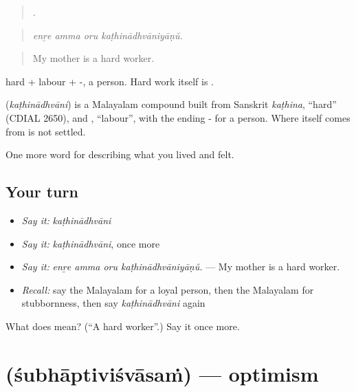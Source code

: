 \begin{quote}
   .
\end{quote}

\begin{quote}
\emph{enṟe amma oru kaṭhinādhvāniyāṇŭ.}
\end{quote}

\begin{quote}
My mother is a hard worker.
\end{quote}

 hard +  labour + -, a person. Hard work itself is .

\begin{cousinweb}
\textbf{} (\emph{kaṭhinādhvāni}) is a Malayalam compound built from Sanskrit \emph{kaṭhina}, \textquotedblleft{}hard\textquotedblright{} (CDIAL 2650), and , \textquotedblleft{}labour\textquotedblright{}, with the ending - for a person. Where  itself comes from is not settled.
\end{cousinweb}

\begin{grammarlens}[title={What you've built}]
One more word for describing what you lived and felt.
\end{grammarlens}

\subsection*{Your turn}
\begin{itemize}
\raggedright
  \item \emph{Say it:} \emph{kaṭhinādhvāni}
  \item \emph{Say it:} \emph{kaṭhinādhvāni}, once more
  \item \emph{Say it:} \emph{enṟe amma oru kaṭhinādhvāniyāṇŭ.} — My mother is a hard worker.
  \item \emph{Recall:} say the Malayalam for a loyal person, then the Malayalam for stubbornness, then say \emph{kaṭhinādhvāni} again
\end{itemize}

\begin{tcolorbox}[breakable,colback=teal!4,colframe=teal!35!black,title={Before you move on}]
What does  mean? (\textquotedblleft{}A hard worker\textquotedblright{}.) Say it once more.
\end{tcolorbox}
\section[\texorpdfstring{\ml{ശുഭാപ്തിവിശ്വാസം} (śubhāptiviśvāsaṁ)}{ശുഭാപ്തിവിശ്വാസം (śubhāptiviśvāsaṁ)}]{ (śubhāptiviśvāsaṁ) — optimism}

